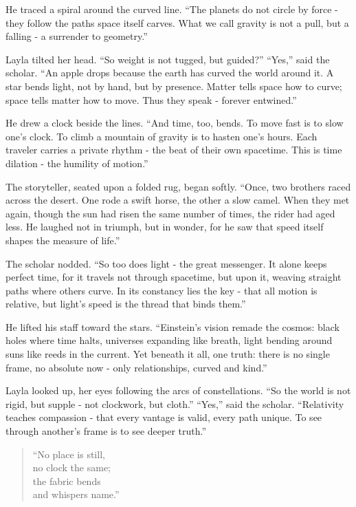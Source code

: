 \documentclass[
  letterpaper,
  DIV=11,
  numbers=noendperiod]{scrreprt}
\begin{document}
He traced a spiral around the curved line. ``The planets do not circle
by force - they follow the paths space itself carves. What we call
gravity is not a pull, but a falling - a surrender to geometry.''

Layla tilted her head. ``So weight is not tugged, but guided?'' ``Yes,''
said the scholar. ``An apple drops because the earth has curved the
world around it. A star bends light, not by hand, but by presence.
Matter tells space how to curve; space tells matter how to move. Thus
they speak - forever entwined.''

He drew a clock beside the lines. ``And time, too, bends. To move fast
is to slow one's clock. To climb a mountain of gravity is to hasten
one's hours. Each traveler carries a private rhythm - the beat of their
own spacetime. This is time dilation - the humility of motion.''

The storyteller, seated upon a folded rug, began softly. ``Once, two
brothers raced across the desert. One rode a swift horse, the other a
slow camel. When they met again, though the sun had risen the same
number of times, the rider had aged less. He laughed not in triumph, but
in wonder, for he saw that speed itself shapes the measure of life.''

The scholar nodded. ``So too does light - the great messenger. It alone
keeps perfect time, for it travels not through spacetime, but upon it,
weaving straight paths where others curve. In its constancy lies the key
- that all motion is relative, but light's speed is the thread that
binds them.''

He lifted his staff toward the stars. ``Einstein's vision remade the
cosmos: black holes where time halts, universes expanding like breath,
light bending around suns like reeds in the current. Yet beneath it all,
one truth: there is no single frame, no absolute now - only
relationships, curved and kind.''

Layla looked up, her eyes following the arcs of constellations. ``So the
world is not rigid, but supple - not clockwork, but cloth.'' ``Yes,''
said the scholar. ``Relativity teaches compassion - that every vantage
is valid, every path unique. To see through another's frame is to see
deeper truth.''

\begin{quote}
``No place is still,\\
no clock the same;\\
the fabric bends\\
and whispers name.''
\end{quote}
\end{document}
